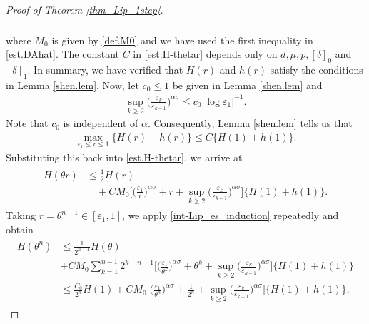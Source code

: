 \documentclass[reqno,12pt]{amsart} %
\theoremstyle{definition}
\theoremstyle{remark}
\numberwithin{equation}{section}
\newcommand{\e}{\varepsilon}
\begin{document}
\begin{proof}[Proof of Theorem \ref{thm_Lip_1step}]
\begin{align}
\begin{split}
        \end{split}
    \end{align}
    where $M_0$ is given by \eqref{def.M0} and we have used the first inequality in \eqref{est.DAhat}. The constant $C$ in \eqref{est.H-thetar} depends only on $d, \mu, p, [\delta]_0$ and $[\delta]_1$. 
    In summary, we have verified that $H(r)$ and $h(r)$ satisfy the conditions in Lemma \ref{shen.lem}. Now, let $c_0\leq 1$ be given in Lemma \ref{shen.lem} and
    \begin{align*}%
        \sup_{k\geq 2}\bigg(\frac{\varepsilon_k}{\varepsilon_{k-1}}\bigg)^{\alpha\sigma}\leq c_0|\log \varepsilon_1|^{-1}.
    \end{align*}
    Note that $c_0$ is independent of $\alpha$. Consequently, Lemma \ref{shen.lem} tells us that
    \begin{align*}
        \max_{\varepsilon_1\leq r\leq 1}\{H(r)+h(r)\}\leq C\{H(1)+h(1)\}.
    \end{align*}
    Substituting this back into \eqref{est.H-thetar}, we arrive at
    \begin{align}\label{int-Lip_es_induction}
    \begin{split}
        H(\theta r)&\leq \frac{1}{2}H(r)\\
        &\quad + CM_0\bigg[\Big(\frac{\varepsilon_1}{r}\Big)^{\alpha\sigma}+r+\sup_{k\geq 2}\bigg(\frac{\varepsilon_k}{\varepsilon_{k-1}}\bigg)^{\alpha\sigma}\bigg]\{H(1)+h(1)\}. 
    \end{split}
    \end{align}
    Taking $r = \theta^{n-1} \in [\e_1, 1]$, we apply \eqref{int-Lip_es_induction} repeatedly and obtain
    \begin{align*}
        \begin{aligned}
            H(\theta^n) & \le \frac{1}{2^{n-1}}H(\theta) \\
            & + CM_0\sum_{k=1}^{n-1}2^{k-n+1}\bigg[\Big(\frac{\varepsilon_1}{\theta^{k}}\Big)^{\alpha\sigma}+\theta^{k}+\sup_{k\geq 2}\bigg(\frac{\varepsilon_k}{\varepsilon_{k-1}}\bigg)^{\alpha\sigma}\bigg] \{H(1)+h(1)\} \\
            & \le \frac{C_0}{2^{n}}H(1)+CM_0\bigg[\Big(\frac{\varepsilon_1}{\theta^{n}}\Big)^{\alpha\sigma}+\frac{1}{2^{n}}+\sup_{k\geq 2}\bigg(\frac{\varepsilon_k}{\varepsilon_{k-1}}\bigg)^{\alpha\sigma}\bigg]\{H(1)+h(1)\},

\end{aligned}
\end{align*}
\end{proof}
\end{document}
